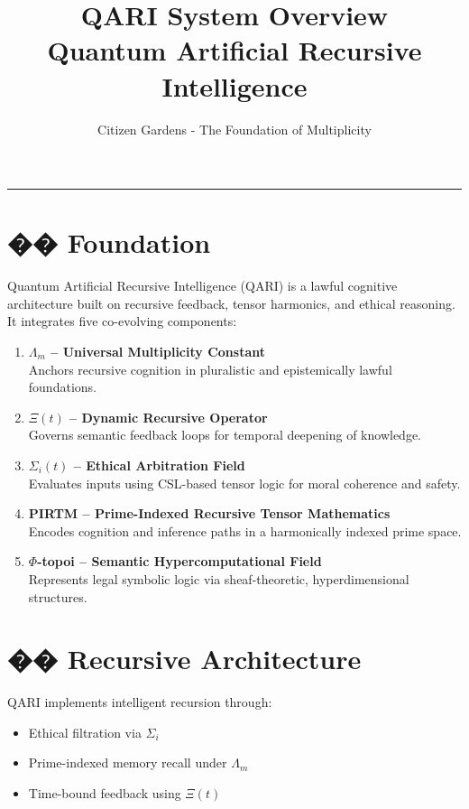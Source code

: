\documentclass[12pt]{article}
\title{\textbf{QARI System Overview}\\ \large Quantum Artificial Recursive Intelligence}
\author{Citizen Gardens - The Foundation of Multiplicity}
\date{}
\begin{document}
\maketitle
\hrule
\vspace{1em}

\section*{�� Foundation}

Quantum Artificial Recursive Intelligence (QARI) is a lawful cognitive architecture built on recursive feedback, tensor harmonics, and ethical reasoning. It integrates five co-evolving components:

\begin{enumerate}
    \item \textbf{$\Lambda_m$ – Universal Multiplicity Constant} \\
    Anchors recursive cognition in pluralistic and epistemically lawful foundations.
    
    \item \textbf{$\Xi(t)$ – Dynamic Recursive Operator} \\
    Governs semantic feedback loops for temporal deepening of knowledge.
    
    \item \textbf{$\Sigma_i(t)$ – Ethical Arbitration Field} \\
    Evaluates inputs using CSL-based tensor logic for moral coherence and safety.
    
    \item \textbf{PIRTM – Prime-Indexed Recursive Tensor Mathematics} \\
    Encodes cognition and inference paths in a harmonically indexed prime space.
    
    \item \textbf{$\Phi$-topoi – Semantic Hypercomputational Field} \\
    Represents legal symbolic logic via sheaf-theoretic, hyperdimensional structures.
\end{enumerate}

\vspace{1em}
\section*{�� Recursive Architecture}

QARI implements intelligent recursion through:

\begin{itemize}
    \item Ethical filtration via $\Sigma_i$
    \item Prime-indexed memory recall under $\Lambda_m$
    \item Time-bound feedback using $\Xi(t)$
\end{itemize}
\end{document}
